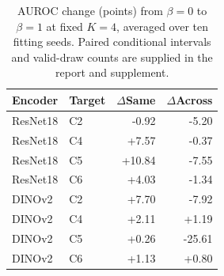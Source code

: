 \begin{table}[!htbp]
\centering\small
\setlength{\tabcolsep}{4pt}
\begin{tabular}{llrr}
\hline
Encoder & Target & $\Delta$Same & $\Delta$Across \\
\hline
ResNet18 & C2 & -0.92 & -5.20 \\
ResNet18 & C4 & +7.57 & -0.37 \\
ResNet18 & C5 & +10.84 & -7.55 \\
ResNet18 & C6 & +4.03 & -1.34 \\
DINOv2 & C2 & +7.70 & -7.92 \\
DINOv2 & C4 & +2.11 & +1.19 \\
DINOv2 & C5 & +0.26 & -25.61 \\
DINOv2 & C6 & +1.13 & +0.80 \\
\hline
\end{tabular}
\caption{AUROC change (points) from $\beta=0$ to $\beta=1$ at fixed $K=4$, averaged over ten fitting seeds. Paired conditional intervals and valid-draw counts are supplied in the report and supplement.}
\label{tab:factorial_ranking}
\end{table}
